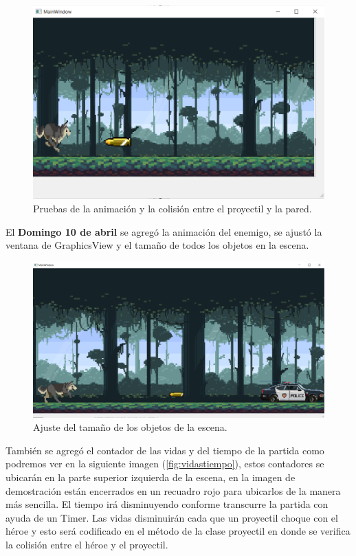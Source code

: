 \documentclass{article}
\begin{document}
\begin{figure}[h]
\includegraphics[scale=0.55]{Images/proyectil2.png}
\centering
\caption{Pruebas de la animación y la colisión entre el proyectil y la pared.}
\label{fig:proyectil2}
\end{figure}

El \textbf{Domingo 10 de abril} se agregó la animación del enemigo, se ajustó la ventana de GraphicsView y el tamaño de todos los objetos en la escena.

\begin{figure}[h]
\includegraphics[scale=0.4]{Images/tamaniobjetosajustado.png}
\centering
\caption{Ajuste del tamaño de los objetos de la escena.}
\label{fig:ajustetamanio}
\end{figure}

También se agregó el contador de las vidas y del tiempo de la partida como podremos ver en la siguiente imagen (\ref{fig:vidastiempo}), estos contadores se ubicarán en la parte superior izquierda de la escena, en la imagen de demostración están encerrados en un recuadro rojo para ubicarlos de la manera más sencilla. El tiempo irá disminuyendo conforme transcurre la partida con ayuda de un Timer. Las vidas disminuirán cada que un proyectil choque con el héroe y esto será codificado en el método de la clase proyectil en donde se verifica la colisión entre el héroe y el proyectil.
\end{document}
